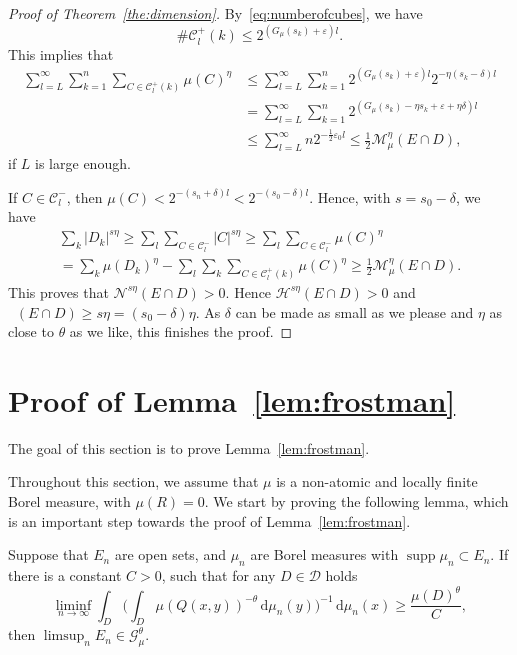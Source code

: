 \documentclass[AHL,Unicode,longabstracts]{cedram}
\DeclareMathOperator{\dimh}{dim_H}
\DeclareMathOperator{\supp}{supp}
\newcommand*{\dimh}{\mathrm{dim}_{\mathrm{H}}}
\newcommand*{\dd}{\mathrm{d}}
\begin{document}
\begin{proof}[Proof of Theorem~\ref{the:dimension}]
By~\eqref{eq:numberofcubes}, we have
\[
\# \mathscr{C}_l^+ (k) \leq 2^{(G_{\mu} (s_k) + \varepsilon)l}.
\]
This implies that
\begin{align*}
\sum_{l=L}^\infty \sum_{k=1}^n \sum_{C \in \mathscr{C}_l^+ (k)}
\mu (C)^\eta &\leq \sum_{l=L}^\infty \sum_{k=1}^n 2^{(G_{\mu} (s_k) + \varepsilon)l} 2^{-\eta (s_k-\delta) l} \\ & =
\sum_{l=L}^\infty \sum_{k=1}^n 2^{(G_\mu (s_k) - \eta s_k +
\varepsilon + \eta \delta) l} \\ &\leq \sum_{l=L}^\infty n 2^{-\frac{1}{2} \varepsilon_0 l} \leq \frac{1}{2}
\mathscr{M}_\mu^\eta (E \cap D),
\end{align*}
if $L$ is large enough.

If $C \in \mathscr{C}_l^-$, then $\mu (C) < 2^{-(s_n+\delta)l} < 2^{-(s_0-\delta)l}$. Hence, with $s = s_0 - \delta$, we have
\begin{multline*}
\sum_k |D_k|^{s \eta} \geq \sum_l \sum_{C \in \mathscr{C}_l^-} |C|^{s \eta} \geq \sum_l \sum_{C \in \mathscr{C}_l^-} \mu (C)^\eta \\ = \sum_k \mu(D_k)^\eta - \sum_l \sum_k \sum_{C \in
\mathscr{C}_l^+ (k)} \mu (C)^\eta \geq \frac{1}{2}
\mathscr{M}_\mu^\eta (E \cap D).
\end{multline*}
This proves that $\mathscr{N}^{s \eta} (E \cap D) > 0$. Hence $\mathscr{H}^{s \eta} (E \cap D) > 0$ and $\dimh (E \cap D) \geq s
\eta = (s_0 - \delta) \eta$. As $\delta$ can be made as small as we please and $\eta$ as close to $\theta$ as we like, this finishes the proof.
\end{proof}


\section{Proof of Lemma~\ref{lem:frostman}} \label{sec:inhomogeneousproofs}

The goal of this section is to prove Lemma~\ref{lem:frostman}.

Throughout this section, we assume that $\mu$ is a non-atomic and locally finite Borel measure, with $\mu (R) = 0$. We start by proving the following lemma, which is an important step towards the proof of Lemma~\ref{lem:frostman}.

\begin{lemm}\label{lem:frostman2}
Suppose that $E_n$ are open sets, and $\mu_n$ are Borel measures with $\supp \mu_n \subset E_n$. If there is a constant $C > 0$, such that for any $D \in \mathscr{D}$ holds
\begin{equation}\label{eq:energycondition}
\liminf_{n \to \infty} \int_D \biggl(\int_D \mu (Q (x,y))^{-\theta} \, \dd \mu_n (y) \biggr)^{-1} \,
\dd \mu_n (x) \geq \frac{\mu (D)^\theta}{C},
\end{equation}
then $\limsup_n E_n \in \mathscr{G}_\mu^\theta$.
\end{lemm}
\end{document}
